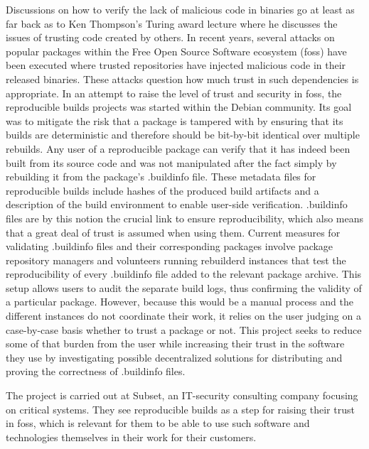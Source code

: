 \documentclass{article}
\begin{document}
Discussions on how to verify the lack of malicious code in binaries go at least as far back as to Ken Thompson's Turing award lecture \cite{thompson_reflections_1984} where he discusses the issues of trusting code created by others. In recent years, several attacks on popular packages within the Free Open Source Software ecosystem (\gls{foss}) have been executed \cite{lamb_reproducible_2021} where trusted repositories have injected malicious code in their released binaries. These attacks question how much trust in such dependencies is appropriate. In an attempt to raise the level of trust and security in \gls{foss}, the reproducible builds projects \cite{noauthor_reproducible_nodate} was started within the Debian community. Its goal was to mitigate the risk that a package is tampered with by ensuring that its builds are deterministic and therefore should be bit-by-bit identical over multiple rebuilds. Any user of a reproducible package can verify that it has indeed been built from its source code and was not manipulated after the fact simply by rebuilding it from the package's .buildinfo file. These metadata files for reproducible builds include hashes of the produced build artifacts and a description of the build environment to enable user-side verification. .buildinfo files are by this notion the crucial link to ensure reproducibility, which also means that a great deal of trust is assumed when using them. Current measures for validating .buildinfo files and their corresponding packages involve package repository managers and volunteers running rebuilderd \cite{rebuilderd_public_nodate} instances that test the reproducibility of every .buildinfo file added to the relevant package archive. This setup allows users to audit the separate build logs, thus confirming the validity of a particular package. However, because this would be a manual process and the different instances do not coordinate their work, it relies on the user judging on a case-by-case basis whether to trust a package or not. This project seeks to reduce some of that burden from the user while increasing their trust in the software they use by investigating possible decentralized solutions for distributing and proving the correctness of .buildinfo files.

The project is carried out at Subset, an IT-security consulting company focusing on critical systems. They see reproducible builds as a step for raising their trust in \gls{foss}, which is relevant for them to be able to use such software and technologies themselves in their work for their customers.
\end{document}

